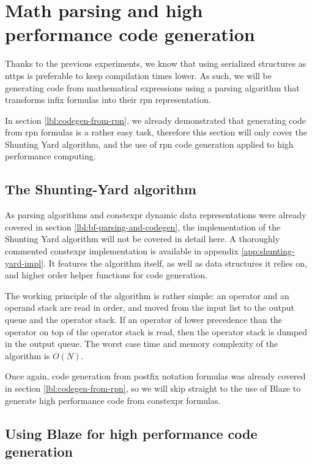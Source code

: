 \documentclass[../main]{subfiles}
\begin{document}

\section{
  Math parsing and high performance code generation
}

Thanks to the previous experiments, we know that using serialized structures
as \glspl{nttp} is preferable to keep compilation times lower.
As such, we will be generating code from mathematical expressions using
a parsing algorithm that transforms infix formulas into their \gls{rpn}
representation.

In section \ref{lbl:codegen-from-rpn}, we already demonstrated that generating code
from \gls{rpn} formulas is a rather easy task, therefore this section
will only cover the Shunting Yard algorithm, and the use of \gls{rpn}
code generation applied to high performance computing.

\subsection{
  The Shunting-Yard algorithm
}

As parsing algorithms and \gls{constexpr} dynamic data representations were
already covered in section \ref{lbl:bf-parsing-and-codegen}, the implementation of
the Shunting Yard algorithm will not be covered in detail here.
A thoroughly commented \gls{constexpr} implementation is available in appendix
\ref{app:shunting-yard-impl}. It features the algorithm itself, as well as
data structures it relies on, and higher order helper functions
for code generation.

The working principle of the algorithm is rather simple:
an operator and an operand stack are read in order, and moved
from the input list to the output queue and the operator stack.
If an operator of lower precedence than the operator on top of the
operator stack is read, then the operator stack is dumped in the output queue.
The worst case time and memory complexity of the algorithm is $O(N)$.

Once again, code generation from postfix notation formulas was already covered
in section \ref{lbl:codegen-from-rpn}, so we will skip straight to the use of Blaze
to generate high performance code from \gls{constexpr} formulas.

\subsection{
  Using Blaze for high performance code generation
}
\end{document}
